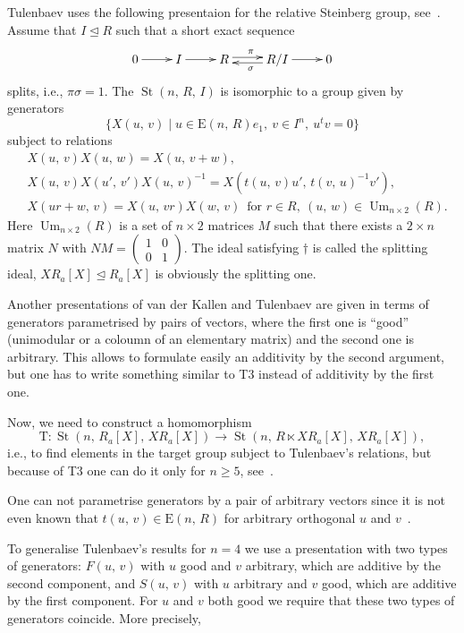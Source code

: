 \documentclass[11pt]{amsart}
\theoremstyle{plain} \declaretheorem[name=Theorem, Refname={Theorem,Theorems}]{tm} \Crefname{tm}{Theorem}{Theorems}
\numberwithin{equation}{section}
\theoremstyle{definition} \newtheorem{df}[lm]{Definition} \Crefname{df}{Definition}{Definitions}
\theoremstyle{remark} \newtheorem{rk}[lm]{Remark} \Crefname{rk}{Remark}{Remarks}
\newcommand{\E}{{\mathrm{E}}}
\newcommand{\Um}{\mathop{\mathrm{Um}}\nolimits}
\newcommand{\St}{\mathop{\mathrm{St}}\nolimits}
\newcommand{\inv}{^{-1}}
\begin{document}
Tulenbaev uses the following presentaion for the relative Steinberg group, see~\cite[Prop.~1.6]{Tul}. Assume that $I\trianglelefteq R$ such that a short exact sequence
\renewcommand{\theequation}{$\dagger$}
\begin{align}
\xymatrix{
0\ar@<0.1ex>[r]^{}&I\ar@<0.1ex>[r]^{}&R\ar@<0.5ex>[r]^{\pi}&R/I\ar@<0.5ex>[l]^{\sigma}\ar@<0.1ex>[r]^{}&0
}
\end{align}
splits, i.e., $\pi\sigma=1$. The $\St(n,\,R,\,I)$ is isomorphic to a group given by generators
$$
\{X(u,\,v)\mid u\in\E(n,\,R)e_1,\ v\in I^n,\ u^tv=0\}
$$
subject to relations
\setcounter{equation}{0}
\renewcommand{\theequation}{T\arabic{equation}}
\begin{align}
&X(u,\,v)X(u,\,w)=X(u,\,v+w),\\
&X(u,\,v)X(u',\,v')X(u,\,v)\inv=X(t(u,\,v)u',\,t(v,\,u)\inv v'),\\
&X(ur+w,\,v)=X(u,\,vr)X(w,\,v)\,\text{ for }r\in R,\ (u,\,w)\in\Um_{n\times2}(R).
\end{align}
Here $\Um_{n\times2}(R)$ is a set of $n\times2$ matrices $M$ such that there exists a $2\times n$ matrix $N$ with $NM=\begin{pmatrix}1&0\\0&1\end{pmatrix}$. The ideal satisfying $\dagger$ is called the splitting ideal, $XR_a[X]\trianglelefteq R_a[X]$ is obviously the splitting one.

Another presentations of van der Kallen and Tulenbaev are given in terms of generators parametrised by pairs of vectors, where the first one is ``good'' (unimodular or a coloumn of an elementary matrix) and the second one is arbitrary. This allows to formulate easily an additivity by the second argument, but one has to write something similar to T3 instead of additivity by the first one.

Now, we need to construct a homomorphism
$$
\mathrm T\colon\St(n,\,R_a[X],\,XR_a[X])\rightarrow\St(n,\,R\ltimes XR_a[X],\,XR_a[X]),
$$
i.e., to find elements in the target group subject to Tulenbaev's relations, but because of T3 one can do it only for $n\geq5$, see~\cite[Lemmas~1.2 and~1.3\,c)]{Tul}.

One can not parametrise generators by a pair of arbitrary vectors since it is not even known that $t(u,\,v)\in\E(n,\,R)$ for arbitrary orthogonal $u$ and $v$~\cite{Rao}. 

To generalise Tulenbaev's results for $n=4$ we use a presentation with two types of generators: $F(u,\,v)$ with $u$ good and $v$ arbitrary, which are additive by the second component, and $S(u,\,v)$ with $u$ arbitrary and $v$ good, which are additive by the first component. For $u$ and $v$ both good we require that these two types of generators coincide. More precisely,
\end{document}
